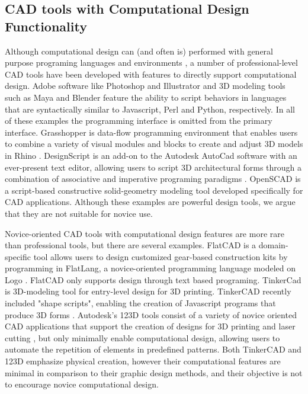 \documentclass{sigchi}
\begin{document}
\subsection{CAD tools with Computational Design Functionality} %
Although computational design can (and often is) performed with general purpose programing languages and environments \cite{reas}, a number of professional-level CAD tools have been developed with features to directly support computational design. Adobe software like Photoshop and Illustrator and 3D modeling tools such as Maya and Blender feature the ability to script behaviors in languages that are syntactically similar to Javascript, Perl and Python, respectively. In all of these examples the programming interface is omitted from the primary interface. Grasshopper is data-flow programming environment that enables users to combine a variety of visual modules and blocks to create and adjust 3D models in Rhino \cite{grasshopper}. DesignScript is an add-on to the Autodesk AutoCad software with an ever-present text editor, allowing users to script 3D architectural forms through a combination of associative and imperative programing paradigms \cite{DesignScript}. OpenSCAD is a script-based constructive solid-geometry modeling tool developed specifically for CAD applications. Although these examples are powerful design tools, we argue that they are not suitable for novice use.

Novice-oriented CAD tools with computational design features are more rare than professional tools, but there are several examples. FlatCAD is a domain-specific tool allows users to design customized gear-based construction kits by programming in FlatLang, a novice-oriented programming language modeled on Logo \cite{flatcad}. FlatCAD only supports design through text based programing. TinkerCad is 3D-modeling tool for entry-level design for 3D printing. TinkerCAD recently included "shape scripts", enabling the creation of Javascript programs that produce 3D forms \cite{tinkercad}. Autodesk's 123D tools consist of a variety of novice oriented CAD applications that support the creation of designs for 3D printing and laser cutting \cite{123D}, but only minimally enable computational design, allowing users to automate the repetition of elements in predefined patterns. Both TinkerCAD and 123D emphasize physical creation, however their computational features are minimal in comparison to their graphic design methods, and their objective is not to encourage novice computational design.
\end{document}
